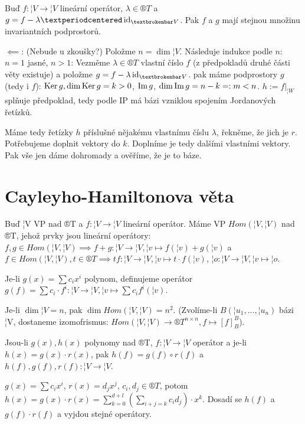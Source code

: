 \documentclass[12pt]{article}                   %
\begin{document}
    \begin{dusledek}
        Buď $f: ¦V \rightarrow ¦V$ lineární operátor, $\lambda \in ®T$ a $g = f - \lambda·\id_{¦V}$. Pak $f$ a $g$ mají stejnou množinu invariantních podprostorů.
    \end{dusledek}

    \begin{dukaz}
        $\impliedby$: (Nebude u zkoušky?) Položme $n = \dim ¦V$. Následuje indukce podle $n$: $n = 1$ jasné, $n > 1$: Vezměme $\lambda \in ®T$ vlastní číslo $f$ (z předpokladů druhé části věty existuje) a položme $g = f - \lambda\id_{¦V}$. pak máme podprostory $g$ (tedy i $f$): $\operatorname{Ker} g, \dim \operatorname{Ker} g = k > 0$, $\operatorname{Im} g$, $\dim \operatorname{Im} g = n-k =: m < n$. $h:= f|_{¦W}$ splňuje předpoklad, tedy podle IP má bázi vzniklou spojením Jordanových řetízků.

        Máme tedy řetízky $h$ příslušné nějakému vlastnímu číslu $\lambda$, řekněme, že jich je $r$. Potřebujeme doplnit vektory do $k$. Doplníme je tedy dalšími vlastními vektory. Pak vše jen dáme dohromady a ověříme, že je to báze.
    \end{dukaz}


\section{Cayleyho-Hamiltonova věta}
    \begin{poznamka}
        Buď ¦V VP nad ®T a $f: ¦V \rightarrow ¦V$ lineární operátor. Máme VP $Hom(¦V, ¦V)$ nad ®T, jehož prvky jsou lineární operátory: $f, g \in Hom(¦V, ¦V) \implies f+g: ¦V \rightarrow ¦V, ¦v \mapsto f(¦v) + g(¦v)$ a $f \in Hom(¦V, ¦V), t \in ®T \implies tf: ¦V \rightarrow ¦V, ¦v \mapsto t·f(¦v)$, $¦o: ¦V \rightarrow ¦V, ¦v \mapsto ¦o$.

        Je-li $g(x) = \sum c_ix^i$ polynom, definujeme operátor $g(f) = \sum c_i·f^i : ¦V \rightarrow ¦V, ¦v \mapsto \sum c_i f^i(¦v)$.

        Je-li $\dim ¦V = n$, pak $\dim Hom(¦V, ¦V) = n^2$. (Zvolíme-li $B(¦u_1, …, ¦u_n)$ bázi ¦V, dostaneme izomofrismus: $Hom(¦V, ¦V) \rightarrow ®T^{n \times n}, f \mapsto [f]_B^B$).
    \end{poznamka}

    \begin{pozorovani}
        Jsou-li $g(x), h(x)$ polynomy nad ®T, $f: ¦V \rightarrow ¦V$ operátor a je-li $h(x) = g(x)·r(x)$, pak $h(f) = g(f)\circ r(f)$ a $h(f), g(f), r(f): ¦V \rightarrow ¦V$.

        \begin{dukazin}
            $g(x) = \sum c_ix^i$, $r(x) = d_jx^j$, $c_i, d_j \in ®T$, potom $h(x) = g(x)·r(x) = \sum_{k=0}^{d+l}(\sum_{i+j = k} c_id_j)·x^{k}$. Dosadí se $h(f)$ a $g(f)·r(f)$ a vyjdou stejné operátory.
        \end{dukazin}
    \end{pozorovani}
\end{document}
